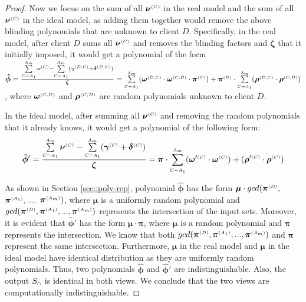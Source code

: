 \begin{proof}
 Now we focus on the sum of all ${\bm\nu}^{\scriptscriptstyle (C)}$ in the real model and the sum of all $ {\bm\nu}^{\scriptscriptstyle (C)}$ in the ideal model, as adding them together would remove the above blinding polynomials that are unknown to client $D$.  Specifically, in the real model, after client $D$ sums all  ${\bm\nu}^{\scriptscriptstyle (C)}$ and removes the blinding factors and $\bm\zeta$ that it initially imposed, it would get a polynomial of the  form 
  $\bm{\hat\phi}= \frac{ \sum\limits^{ \scriptscriptstyle {   A}_{ \scriptscriptstyle {   m}}}_{  \scriptscriptstyle {  {C }= }  \scriptscriptstyle {   A}_{ \scriptscriptstyle {  1}}}\bm\nu^{ \scriptscriptstyle {  {(C)}} }-\sum\limits^{ \scriptscriptstyle {   A}_{ \scriptscriptstyle {   m}}}_{  \scriptscriptstyle {  {C }= }  \scriptscriptstyle {   A}_{ \scriptscriptstyle {  1}}}(\bm\gamma^{ \scriptscriptstyle {  {(D,C)}}} + \bm\delta^{ \scriptscriptstyle {  {(D,C)}}})}{\bm\zeta}= \sum\limits^{ \scriptscriptstyle {   A}_{ \scriptscriptstyle {   m}}}_{ \scriptscriptstyle {  {C }= }  \scriptscriptstyle {   A}_{ \scriptscriptstyle {  1}}}(\bm\omega^{ \scriptscriptstyle {  {(D,C)}}} \cdot \bm\omega^{ \scriptscriptstyle {  {(C,D)}}}\cdot \bm\pi^{ \scriptscriptstyle {  (C)}}) +\bm\pi^{ \scriptscriptstyle {  {(D)}}}\cdot\sum\limits^{ \scriptscriptstyle {   A}_{ \scriptscriptstyle {   m}}}_{ \scriptscriptstyle {  {C }= }  \scriptscriptstyle {   A}_{ \scriptscriptstyle {  1}}}(\bm\rho^{ \scriptscriptstyle {  {(D,C)}}} \cdot \bm\rho^{ \scriptscriptstyle {  {(C,D)}}}) $, 
%
  where $\bm\omega^{ \scriptscriptstyle {  {(C,D)}}}$ and $\bm\rho^{ \scriptscriptstyle {  {(C,D)}}}$ are random polynomials unknown to client $D$. 
 
 In the ideal model, after summing all $ {\bm\nu}^{\scriptscriptstyle (C)}$ and removing the random polynomials that it already knows, it would get a polynomial of the following form: 
 $$\bm{\hat\phi}'= \frac{\sum\limits^{ \scriptscriptstyle {   A}_{ \scriptscriptstyle {   m}}}_{  \scriptscriptstyle {  {C }= }  \scriptscriptstyle {   A}_{ \scriptscriptstyle {  1}}} {\bm\nu}^{\scriptscriptstyle(C)}-\sum\limits^{ \scriptscriptstyle {   A}_{ \scriptscriptstyle {   m}}}_{  \scriptscriptstyle {  {C }= }  \scriptscriptstyle {   A}_{ \scriptscriptstyle {  1}}}( {\bm\gamma}^{\scriptscriptstyle(C)} +  {\bm\delta}^{\scriptscriptstyle(C)})}{ {\bm\zeta}}=  {\bm\pi}\cdot\sum\limits^{ \scriptscriptstyle {   A}_{ \scriptscriptstyle {   m}}}_{ \scriptscriptstyle {  {C }= }  \scriptscriptstyle {   A}_{ \scriptscriptstyle {  1}}}( {\bm\omega}'^{\scriptscriptstyle(C)} \cdot  {\bm\omega}^{\scriptscriptstyle(C)})+( {\bm\rho}'^{\scriptscriptstyle(C)} \cdot  {\bm\rho}^{\scriptscriptstyle(C)})  $$  
 
 
 As shown in Section \ref{sec::poly-rep},  polynomial $\bm{\hat\phi}$ has the form $\bm\mu\cdot gcd( \bm\pi^{ \scriptscriptstyle {  {(D)}} },$ $\bm\pi^{\scriptscriptstyle (A_1)}, ..., $ $\bm\pi^{\scriptscriptstyle (A_m)})$, where $\bm\mu$ is a uniformly random polynomial and $gcd( \bm\pi^{ \scriptscriptstyle {  {(D)}} },\bm\pi^{\scriptscriptstyle (A_1)}, ..., \bm\pi^{\scriptscriptstyle (A_m)})$ represents the intersection of the input sets. Moreover, it is evident that $\bm{\hat\phi}'$ has the form $ {\bm\mu} \cdot  {\bm\pi}$, where $ {\bm\mu} $ is a random polynomial and $ {\bm\pi}$ represents the intersection. We know that both $gcd( \bm\pi^{ \scriptscriptstyle {  {(D)}} },\bm\pi^{\scriptscriptstyle (A_1)}, ..., \bm\pi^{\scriptscriptstyle (A_m)})$ and $ {\bm\pi}$  represent the same intersection. Furthermore,  ${\bm\mu} $ in the real model and $ {\bm\mu} $ in the ideal model have identical distribution as they are uniformly random polynomials. Thus, two polynomials $\bm{\hat\phi}$ and $\bm{\hat\phi}'$ are indistinguishable. Also, the output $S_{\scriptscriptstyle \cap}$ is identical in both views. We conclude that the two views are computationally indistinguishable.
 

\end{proof}
